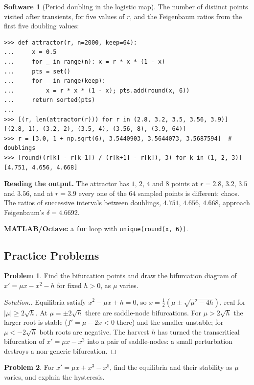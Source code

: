 \documentclass[11pt,a4paper]{article}
\numberwithin{equation}{section}
\theoremstyle{definition}
\newtheorem{software}[thm]{Software}
\newtheorem{problemx}{Problem}[subsection]
\newenvironment{problem}{\begin{problemx}}{\end{problemx}}
\newenvironment{solution}
  {\renewcommand{\qedsymbol}{}\begin{proof}[\textit{Solution}.]}
  {\end{proof}}
\begin{document}
\begin{software}[Period doubling in the logistic map]
\label{sw:feigenbaum}
The number of distinct points visited after transients, for five values of $r$, and the Feigenbaum ratios from the first five doubling values:
{\small\begin{verbatim}
>>> def attractor(r, n=2000, keep=64):
...     x = 0.5
...     for _ in range(n): x = r * x * (1 - x)
...     pts = set()
...     for _ in range(keep):
...         x = r * x * (1 - x); pts.add(round(x, 6))
...     return sorted(pts)
...
>>> [(r, len(attractor(r))) for r in (2.8, 3.2, 3.5, 3.56, 3.9)]
[(2.8, 1), (3.2, 2), (3.5, 4), (3.56, 8), (3.9, 64)]
>>> r = [3.0, 1 + np.sqrt(6), 3.5440903, 3.5644073, 3.5687594]  # doublings
>>> [round((r[k] - r[k-1]) / (r[k+1] - r[k]), 3) for k in (1, 2, 3)]
[4.751, 4.656, 4.668]
\end{verbatim}}
\textbf{Reading the output.} The attractor has $1$, $2$, $4$ and $8$ points at $r = 2.8$, $3.2$, $3.5$ and $3.56$, and at $r = 3.9$ every one of the $64$ sampled points is different: chaos. The ratios of successive intervals between
doublings, $4.751$, $4.656$, $4.668$, approach Feigenbaum's $\delta = 4.6692$.

\textbf{MATLAB/Octave:} a \texttt{for} loop with \texttt{unique(round(x, 6))}.
\end{software}

\subsection{Practice Problems}

\begin{problem}
Find the bifurcation points and draw the bifurcation diagram of $x' = \mu x - x^2 - h$ for fixed $h > 0$, as $\mu$ varies.
\end{problem}

\begin{solution}
Equilibria satisfy $x^2 - \mu x + h = 0$, so $x = \frac12(\mu \pm \sqrt{\mu^2 - 4h})$, real for $|\mu| \geq 2\sqrt h$. At $\mu = \pm2\sqrt h$ there are saddle-node bifurcations. For $\mu > 2\sqrt h$ the larger root is stable
($f' = \mu - 2x < 0$ there) and the smaller unstable; for $\mu < -2\sqrt h$ both roots are negative. The harvest $h$ has turned the transcritical bifurcation of $x' = \mu x - x^2$ into a pair of saddle-nodes: a small
perturbation destroys a non-generic bifurcation.
\end{solution}

\begin{problem}
For $x' = \mu x + x^3 - x^5$, find the equilibria and their stability as $\mu$ varies, and explain the hysteresis.
\end{problem}
\end{document}
